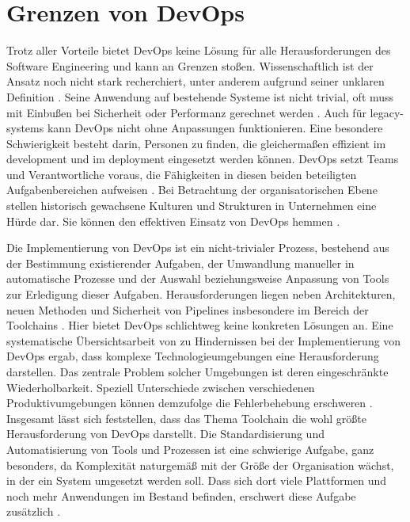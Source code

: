\section{Grenzen von DevOps}
\label{sec:03-02_limitations-of-devops}

Trotz aller Vorteile bietet DevOps keine Lösung für alle Herausforderungen des Software Engineering und kann an Grenzen stoßen. Wissenschaftlich ist der Ansatz noch nicht stark recherchiert, unter anderem aufgrund seiner unklaren Definition \cite{009:GitOps-Evolution-of-DevOps}. Seine Anwendung auf bestehende Systeme ist nicht trivial, oft muss mit Einbußen bei Sicherheit oder Performanz gerechnet werden \cite{000:CI-CD-Deployment-in-DevOps-reduce-Gap-Developer-Operation}. Auch für \Glspl{legacy-system} kann DevOps nicht ohne Anpassungen funktionieren. Eine besondere Schwierigkeit besteht darin, Personen zu finden, die gleichermaßen effizient im \Gls{development} und im \Gls{deployment} eingesetzt werden können. DevOps setzt Teams und Verantwortliche voraus, die Fähigkeiten in diesen beiden beteiligten Aufgabenbereichen aufweisen \cite{001:DevOps-Adoption-in-Software-Development}. Bei Betrachtung der organisatorischen Ebene stellen historisch gewachsene Kulturen und Strukturen in Unternehmen eine Hürde dar. Sie können den effektiven Einsatz von DevOps hemmen \cite{000:CI-CD-Deployment-in-DevOps-reduce-Gap-Developer-Operation}.

Die Implementierung von DevOps ist ein nicht-trivialer Prozess, bestehend aus der Bestimmung existierender Aufgaben, der Umwandlung manueller in automatische Prozesse und der Auswahl beziehungsweise Anpassung von Tools zur Erledigung dieser Aufgaben. Herausforderungen liegen neben Architekturen, neuen Methoden und Sicherheit von Pipelines insbesondere im Bereich der Toolchains \cite{007:Analysis-of-Declarative-and-Pull-based-Deployment-Models-on-GitOps}. Hier bietet DevOps schlichtweg keine konkreten Lösungen an. Eine systematische Übersichtsarbeit von \citeauthor{001:DevOps-Adoption-in-Software-Development} zu Hindernissen bei der Implementierung von DevOps ergab, dass komplexe Technologieumgebungen eine Herausforderung darstellen. Das zentrale Problem solcher Umgebungen ist deren eingeschränkte Wiederholbarkeit. Speziell Unterschiede zwischen verschiedenen Produktivumgebungen können demzufolge die Fehlerbehebung erschweren \cite{001:DevOps-Adoption-in-Software-Development}. Insgesamt lässt sich feststellen, dass das Thema Toolchain die wohl größte Herausforderung von DevOps darstellt. Die Standardisierung und Automatisierung von Tools und Prozessen ist eine schwierige Aufgabe, ganz besonders, da Komplexität naturgemäß mit der Größe der Organisation wächst, in der ein System umgesetzt werden soll. Dass sich dort viele Plattformen und noch mehr Anwendungen im Bestand befinden, erschwert diese Aufgabe zusätzlich \cite{000:CI-CD-Deployment-in-DevOps-reduce-Gap-Developer-Operation}.

